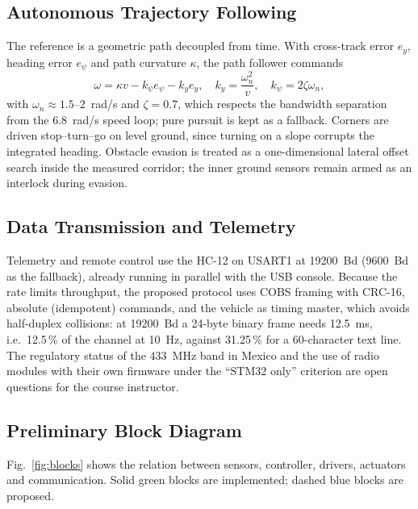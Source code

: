 \documentclass[conference]{IEEEtran}\newcommand{\haveieee}{}%
\begin{document}
\subsection{Autonomous Trajectory Following}
The reference is a geometric path decoupled from time. With cross-track error $e_y$, heading error $e_\psi$ and path curvature $\kappa$, the path follower commands
\begin{equation}
\omega=\kappa v-k_\psi e_\psi-k_y e_y,\quad k_y=\frac{\omega_n^2}{v},\quad k_\psi=2\zeta\omega_n,
\label{eq:path}
\end{equation}
with $\omega_n\approx1.5$--$2$~rad/s and $\zeta=0.7$, which respects the bandwidth separation from the 6.8~rad/s speed loop; pure pursuit is kept as a fallback. Corners are driven stop--turn--go on level ground, since turning on a slope corrupts the integrated heading. Obstacle evasion is treated as a one-dimensional lateral offset search inside the measured corridor; the inner ground sensors remain armed as an interlock during evasion.

\subsection{Data Transmission and Telemetry}
Telemetry and remote control use the HC-12 on USART1 at 19200~Bd (9600~Bd as the fallback), already running in parallel with the USB console. Because the rate limits throughput, the proposed protocol uses COBS framing with CRC-16, absolute (idempotent) commands, and the vehicle as timing master, which avoids half-duplex collisions: at 19200~Bd a 24-byte binary frame needs 12.5~ms, i.e.\ 12.5\,\% of the channel at 10~Hz, against 31.25\,\% for a 60-character text line. The regulatory status of the 433~MHz band in Mexico and the use of radio modules with their own firmware under the ``STM32 only'' criterion are open questions for the course instructor.

\subsection{Preliminary Block Diagram}
Fig.~\ref{fig:blocks} shows the relation between sensors, controller, drivers, actuators and communication. Solid green blocks are implemented; dashed blue blocks are proposed.
\end{document}
